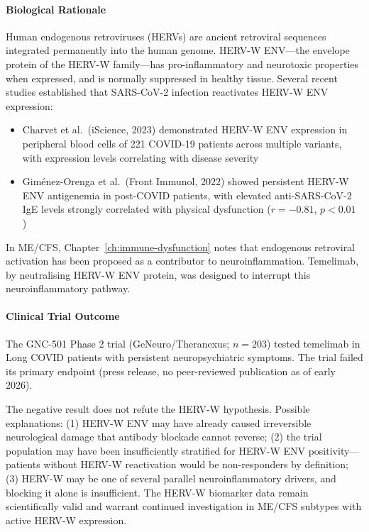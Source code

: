 \paragraph{Biological Rationale}

Human endogenous retroviruses (HERVs) are ancient retroviral sequences integrated permanently into the human genome. HERV-W ENV---the envelope protein of the HERV-W family---has pro-inflammatory and neurotoxic properties when expressed, and is normally suppressed in healthy tissue. Several recent studies established that SARS-CoV-2 infection reactivates HERV-W ENV expression:
\begin{itemize}
    \item Charvet et al.\ (iScience, 2023) demonstrated HERV-W ENV expression in peripheral blood cells of 221 COVID-19 patients across multiple variants, with expression levels correlating with disease severity~\cite{Charvet2023HERV}
    \item Giménez-Orenga et al.\ (Front Immunol, 2022) showed persistent HERV-W ENV antigenemia in post-COVID patients, with elevated anti-SARS-CoV-2 IgE levels strongly correlated with physical dysfunction ($r = -0.81$, $p < 0.01$)~\cite{GimenezOrenga2022HERV}
\end{itemize}
In ME/CFS, Chapter~\ref{ch:immune-dysfunction} notes that endogenous retroviral activation has been proposed as a contributor to neuroinflammation. Temelimab, by neutralising HERV-W ENV protein, was designed to interrupt this neuroinflammatory pathway.

\paragraph{Clinical Trial Outcome}

The GNC-501 Phase 2 trial (GeNeuro/Theranexus; $n=203$) tested temelimab in Long COVID patients with persistent neuropsychiatric symptoms. The trial failed its primary endpoint (press release, no peer-reviewed publication as of early 2026).

\begin{limitation}
The negative result does not refute the HERV-W hypothesis. Possible explanations: (1) HERV-W ENV may have already caused irreversible neurological damage that antibody blockade cannot reverse; (2) the trial population may have been insufficiently stratified for HERV-W ENV positivity---patients without HERV-W reactivation would be non-responders by definition; (3) HERV-W may be one of several parallel neuroinflammatory drivers, and blocking it alone is insufficient. The HERV-W biomarker data remain scientifically valid and warrant continued investigation in ME/CFS subtypes with active HERV-W expression.
\end{limitation}

